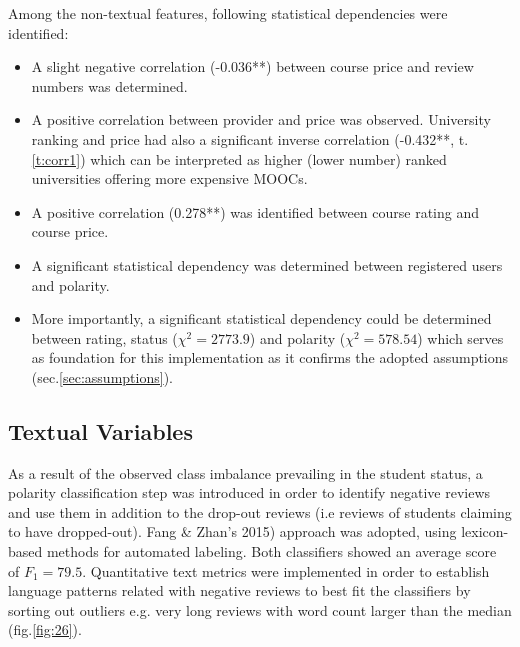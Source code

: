 \documentclass[
	a4paper,
	pdftex,
	12pt,	
	footinclude=true,
	fleqn,
	final,
	]{report}%
\begin{document}
Among the non-textual features, following statistical 
dependencies were identified:
\begin{itemize}
 \item A slight negative correlation (-0.036**) between course price and 
 review numbers was determined. 
 \item A positive correlation between provider and price was 
observed. University ranking and price had also a significant inverse correlation 
(-0.432**, t.\ref{t:corr1}) which can be interpreted as higher 
(lower number) ranked universities offering more expensive MOOCs.
 \item A positive correlation (0.278**) was identified between
 course rating and course price.
\item A significant statistical dependency was determined between 
registered users and polarity.
\item More importantly, a significant statistical dependency could be determined
between rating, status ($\chi^{2}=2773.9$) and polarity ($\chi^{2}=578.54$) 
which serves as foundation for this implementation as it confirms
the adopted assumptions (sec.\ref{sec:assumptions}).
\end{itemize}
\vspace{-0.45cm}
\subsection*{Textual Variables}
\vspace{-0.3cm}
As a result of the observed class imbalance prevailing in the student status, 
a polarity classification step was introduced in order to identify 
negative reviews and use them in addition to the 
drop-out reviews (i.e reviews of students claiming to have dropped-out).
Fang \& Zhan's 2015) approach was adopted, using lexicon-based methods for 
automated labeling. Both classifiers showed an average score of $F_{1} = 79.5$. 
Quantitative text metrics were implemented in order to establish
language patterns related with negative reviews to best fit the classifiers
by sorting out outliers e.g. very long reviews with word count larger 
than the median (fig.\ref{fig:26}). 
\end{document}
